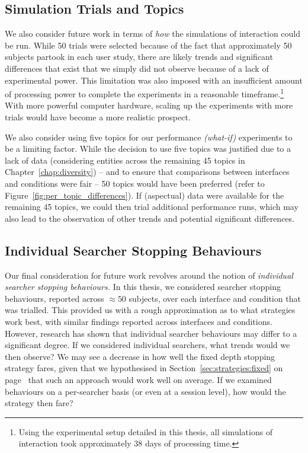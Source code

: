 \subsection{Simulation Trials and Topics}\label{sec:conclusions:future:running}
We also consider future work in terms of \emph{how} the simulations of interaction could be run. While 50 trials were selected because of the fact that approximately 50 subjects partook in each user study, there are likely trends and significant differences that exist that we simply did not observe because of a lack of experimental power. This limitation was also imposed with an insufficient amount of processing power to complete the experiments in a reasonable timeframe.\footnote{Using the experimental setup detailed in this thesis, all simulations of interaction took approximately $38$ days of processing time.} With more powerful computer hardware, scaling up the experiments with more trials would have become a more realistic prospect.

We also consider using five topics for our performance \emph{(what-if)} experiments to be a limiting factor. While the decision to use five topics was justified due to a lack of data (considering entities across the remaining 45 topics in Chapter~\ref{chap:diversity}) -- and to ensure that comparisons between interfaces and conditions were fair -- 50 topics would have been preferred (refer to Figure~\ref{fig:per_topic_differences}). If (aspectual) data were available for the remaining 45 topics, we could then trial additional performance runs, which may also lead to the observation of other trends and potential significant differences.

\subsection{Individual Searcher Stopping Behaviours}\label{sec:conclusions:future:individual}
Our final consideration for future work revolves around the notion of \emph{individual searcher stopping behaviours.} In this thesis, we considered searcher stopping behaviours, reported across $\approx50$ subjects, over each interface and condition that was trialled. This provided us with a rough approximation as to what strategies work best, with similar findings reported across interfaces and conditions. However, research has shown that individual searcher behaviours may differ to a significant degree. If we considered individual searchers, what trends would we then observe? We may see a decrease in how well the fixed depth stopping strategy  fares, given that we hypothesised in Section~\ref{sec:strategies:fixed} on page~\pageref{sec:strategies:fixed} that such an approach would work well on average. If we examined behaviours on a per-searcher basis (or even at a session level), how would the strategy then fare?

